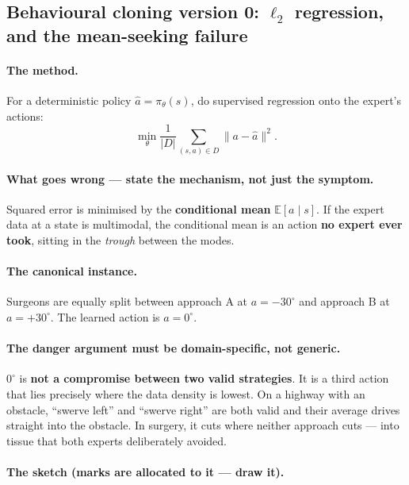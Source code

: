 \documentclass[11pt,a4paper]{article}
\begin{document}
\subsection{Behavioural cloning version 0: $\ell_2$ regression, and the mean-seeking failure}

\paragraph{The method.} For a deterministic policy $\hat a=\pi_\theta(s)$,
do supervised regression onto the expert's actions:
\[
\min_\theta \frac{1}{|D|}\sum_{(s,a)\in D}\|a-\hat a\|^2 .
\]

\paragraph{What goes wrong --- state the mechanism, not just the symptom.}
Squared error is minimised by the \textbf{conditional mean}
$\mathbb E[a\mid s]$. If the expert data at a state is multimodal, the
conditional mean is an action \textbf{no expert ever took}, sitting in the
\emph{trough} between the modes.

\paragraph{The canonical instance.} Surgeons are equally split between
approach A at $a=-30^\circ$ and approach B at $a=+30^\circ$. The learned
action is $a=0^\circ$.

\paragraph{The danger argument must be domain-specific, not generic.}
$0^\circ$ is \textbf{not a compromise between two valid strategies}. It is a
third action that lies precisely where the data density is lowest. On a
highway with an obstacle, ``swerve left'' and ``swerve right'' are both valid
and their average drives straight into the obstacle. In surgery, it cuts
where neither approach cuts --- into tissue that both experts deliberately
avoided.

\paragraph{The sketch (marks are allocated to it --- draw it).}
\end{document}
